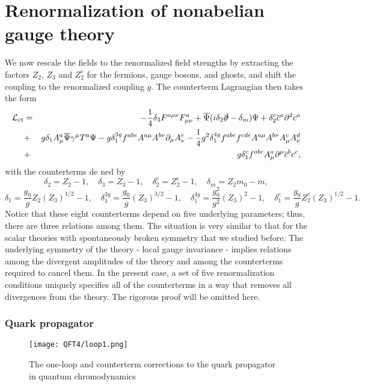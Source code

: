 \section{Renormalization of nonabelian gauge theory}
We now rescale the fields to the renormalized field strengths by extracting the factors $Z_2$, $Z_3$ and $Z_2^c$ for the fermions, gauge bosons, and ghosts, and shift the coupling to the renormalized coupling $g$. The counterterm Lagrangian then takes the form
\begin{eqnarray}
\mathcal{L}_{\rm ct} &=& -\frac{1}{4}\delta_3 F^{a\mu\nu}F^a_{\mu\nu} + \overline{\Psi}(i\delta_2\slashed{\partial}-\delta_m)\Psi + \delta_2^c \overline{c}^a \partial^2 c^a \nonumber \\
&+& g\delta_1 A^a_{\mu}\overline{\Psi}\gamma^{\mu}T^a\Psi -g\delta_{1}^{3g} f^{abe}A^{a\mu}A^{b\nu}\partial_{\mu}A^e_{\nu} - \frac{1}{4}g^2\delta_1^{4g} f^{abe}f^{cde}A^{a\mu}A^{b\nu}A^c_{\mu}A^d_{\nu} \nonumber \\
&+& g\delta_1^c f^{abc}A^a_{\mu}\partial^{\mu}\overline{c}^b c^c ,\nonumber
\end{eqnarray}
with the counterterms de ned by
\[\delta_2 = Z_2 - 1 , \quad \delta_3 = Z_3 - 1 , \quad \delta_2^c = Z_2^c - 1 , \quad \delta_m = Z_2m_0-m,\]
\[\delta_1 = \frac{g_0}{g}Z_2(Z_3)^{1/2} - 1 , \quad \delta_1^{3g} = \frac{g_0}{g}(Z_3)^{3/2} - 1 , \quad \delta_1^{4g} = \frac{g_0^2}{g^2}(Z_3)^2 - 1 , \quad \delta_1^c = \frac{g_0}{g}Z_2^c(Z_3)^{1/2} - 1.\]
Notice that these eight counterterms depend on five underlying parameters; thus, there are three relations among them. The situation is very similar to that for the scalar theories with spontaneously broken symmetry that we studied before. 
The underlying symmetry of the theory - local gauge invariance - implies relations among the divergent amplitudes of the theory and among the counterterms required to cancel them. 
In the present case, a set of five renormalization conditions uniquely specifies all of the counterterms in a way that removes all divergences from the theory.
The rigorous proof will be omitted here.

\subsubsection{Quark propagator}
\begin{figure}[!h]
	\centering
	\texttt{[image: QFT4/loop1.png]}
	\caption{The one-loop and counterterm corrections to the quark propagator in quantum chromodynamics}
\end{figure}

